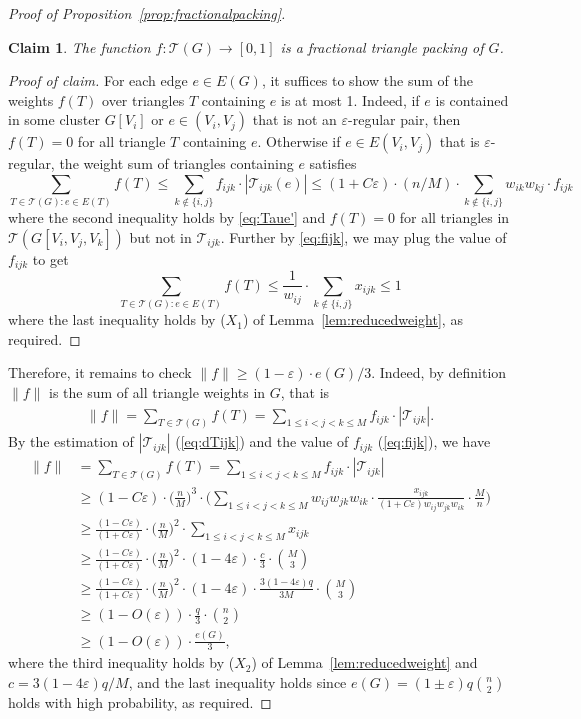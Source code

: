 \documentclass[11pt,reqno]{amsart}
\newenvironment{poc}{\begin{proof}[Proof of claim]\renewcommand*{\qedsymbol}{$\blacksquare$}}{\end{proof}}
\newtheorem{claim}[theorem]{Claim}
\theoremstyle{definition}
\theoremstyle{remark}
\newcommand\dT{\mathcal{T}}
\renewcommand\leq{\leqslant}
\renewcommand\geq{\geqslant}
\begin{document}
\begin{proof}[Proof of Proposition~\ref{prop:fractionalpacking}]
\begin{claim}
The function $f:\dT(G)\rightarrow [0,1]$ is a fractional triangle packing of $G$.
\end{claim}
\begin{poc}
For each edge $e\in E(G)$, it suffices to show the sum of the weights $f(T)$ over triangles $T$ containing $e$ is at most 1. Indeed, if $e$ is contained in some cluster $G[V_i]$ or $e\in (V_i,V_j)$ that is not an $\varepsilon$-regular pair, then $f(T)=0$ for all triangle $T$ containing $e$. Otherwise if $e\in E(V_i,V_j)$ that is $\varepsilon$-regular, the weight sum of triangles containing $e$ satisfies
$$\sum_{T\in \dT(G): e\in E(T)}f(T)\leq\sum_{k\notin\{i,j\}} f_{ijk}\cdot |\dT_{ijk}(e)|\leq(1+C\varepsilon)\cdot(n/M)\cdot\sum_{k\notin\{i,j\}}w_{ik}w_{kj}\cdot f_{ijk}$$
where the second inequality holds by \eqref{eq:Taue'} and $f(T)=0$ for all triangles in $\dT(G[V_i,V_j,V_k])$ but not in $\dT_{ijk}$. Further by \eqref{eq:fijk}, we may plug the value of $f_{ijk}$ to get
$$\sum_{T\in \dT(G): e\in E(T)}f(T)\leq \frac{1}{w_{ij}}\cdot\sum_{k\notin\{i,j\}}x_{ijk}\leq1$$
where the last inequality holds by ($X_1$) of Lemma~\ref{lem:reducedweight}, as required.
\end{poc}

Therefore, it remains to check $\|f\|\geq(1-\varepsilon)\cdot e(G)/3$. Indeed, by definition $\|f\|$ is the sum of all triangle weights in $G$, that is
\begin{align*}
\|f\|=\sum_{T\in\dT(G)}f(T)=\sum_{1\leq i<j<k\leq M}f_{ijk}\cdot|\dT_{ijk}|.
\end{align*}
By the estimation of $|\dT_{ijk}|$ (\eqref{eq:dTijk}) and the value of $f_{ijk}$ (\eqref{eq:fijk}), we have
\begin{align*}
\|f\|&=\sum_{T\in\dT(G)}f(T)=\sum_{1\leq i<j<k\leq M}f_{ijk}\cdot|\dT_{ijk}|\\
&\geq (1-C\varepsilon)\cdot \bigg(\frac{n}{M}\bigg)^3\cdot \bigg(\sum_{1\leq i<j<k\leq M}  w_{ij}w_{jk}w_{ik}\cdot \frac{x_{ijk}}{(1+C\varepsilon)w_{ij}w_{jk}w_{ik}}\cdot\frac{M}{n}\bigg)\\
&\geq \frac{(1-C\varepsilon)}{(1+C\varepsilon)}\cdot\bigg(\frac{n}{M}\bigg)^2\cdot\sum_{1\leq i<j<k\leq M}x_{ijk}\\
&\geq \frac{(1-C\varepsilon)}{(1+C\varepsilon)}\cdot\bigg(\frac{n}{M}\bigg)^2\cdot (1-4\varepsilon)\cdot \frac{c}{3}\cdot\binom{M}{3}\\
&\geq \frac{(1-C\varepsilon)}{(1+C\varepsilon)}\cdot\bigg(\frac{n}{M}\bigg)^2\cdot (1-4\varepsilon)\cdot \frac{3(1-4\varepsilon)q}{3M}\cdot\binom{M}{3}\\
&\geq (1-O(\varepsilon))\cdot \frac{q}{3}\cdot\binom{n}{2}\\
&\geq (1-O(\varepsilon))\cdot \frac{e(G)}{3},
\end{align*}
where the third inequality holds by ($X_2$) of Lemma~\ref{lem:reducedweight} and $c=3(1-4\varepsilon)q/M$, and the last inequality holds since $e(G)= (1\pm\varepsilon)q\binom{n}{2}$ holds with high probability, as required.
\end{proof}
\end{document}

